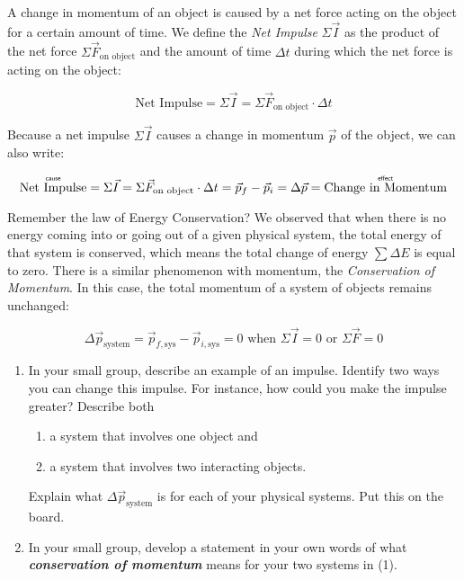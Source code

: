 A change in momentum of an object is caused by a net force acting on the object for a certain amount of time. We define the \emph{Net Impulse} $\Sigma\vec{I}$ as the product of the net force $\Sigma\vec{F}_\text{on object}$ and the amount of time $\Delta t$ during which the net force is acting on the object:
\vspace{-5pt}

\begin{equation*}
	\text{Net Impulse} = \Sigma\vec{I} = \Sigma\vec{F}_\text{on object} \cdot \Delta t
\end{equation*}

\noindent Because a net impulse $\Sigma\vec{I}$ causes a change in momentum $\vec{p}$ of the object, we can also write:
\vspace{-10pt}

\begin{equation*}
	\overset{\mbox{\normalfont\tiny\sffamily cause}}{\text{Net Impulse}} = \Sigma\vec{I} = \Sigma\vec{F}_\text{on object} \cdot \Delta t = \vec{p}_f - \vec{p}_i = \Delta\vec{p} = \overset{\mbox{\normalfont\tiny\sffamily effect}}{\text{Change in Momentum}}
\end{equation*}

\noindent Remember the law of Energy Conservation? We observed that when there is no energy coming into or going out of a given physical system, the total energy of that system is conserved, which means the total change of energy $\sum\Delta E$ is equal to zero. There is a similar phenomenon with momentum, the \emph{Conservation of Momentum}. In this case, the total momentum of a system of objects remains unchanged:
\vspace{-5pt}

\begin{equation*}
	\Delta \vec{p}_\text{system} = \vec{p}_{f,\text{sys}} - \vec{p}_{i,\text{sys}} = 0 \text{  when  } \Sigma\vec{I} = 0 \text{  or  } \Sigma\vec{F} = 0	
\end{equation*}

\begin{enumerate}
	\item In your small group, describe an example of an impulse. Identify two ways you can change this impulse. For instance, how could you make the impulse greater?   Describe both 
	\begin{enumerate}
		\item a system that involves one object and 
		\item a system that involves two interacting objects.
	\end{enumerate}
	Explain what $\Delta \vec{p}_\text{system}$ is for each of your physical systems. Put this on the board.
	
	\item In your small group, develop a statement in your own words of what \textbf{\em conservation of momentum} means for your two systems in (1).
\end{enumerate}

